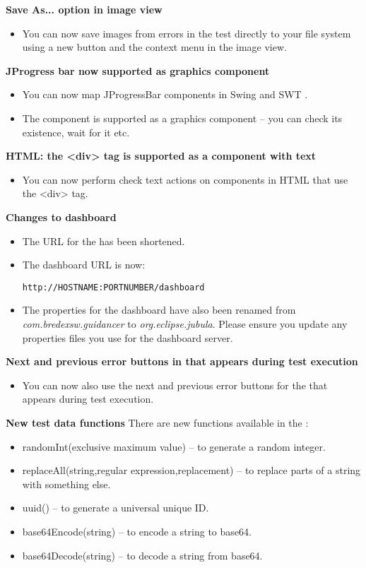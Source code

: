 \textbf{Save As... option in image view}
\begin{itemize}
\item You can now save images from errors in the test directly to your file system  using a new button and the context menu in the image view.
\end{itemize}

\textbf{JProgress bar now supported as graphics component}
\begin{itemize}
\item You can now map JProgressBar components in Swing and SWT \gdauts{}.
\item The component is supported as a graphics component -- you can check its existence, wait for it etc.
\end{itemize}

\textbf{HTML: the <div> tag is supported as a component with text}
\begin{itemize}
\item You can now perform check text actions on components in HTML \gdauts{} that use the <div> tag.
\end{itemize}

\textbf{Changes to dashboard}
\begin{itemize}
\item The URL for the \dash{} has been shortened. 
\item The dashboard URL is now:
\begin{verbatim}
http://HOSTNAME:PORTNUMBER/dashboard
\end{verbatim}
\item The properties for the dashboard have also been renamed from \textit{com.bredexsw.guidancer} to \textit{org.eclipse.jubula}. Please ensure you update any properties files you use for the dashboard server.
\end{itemize}

\textbf{Next and previous error buttons in \gdtestresultview{} that appears during test execution}
\begin{itemize}
\item You can now also use the next and previous error buttons for the \gdtestresultview{} that appears during test execution.
\end{itemize}

\textbf{New test data functions}
There are new functions available in the \ite{}:
\begin{itemize}
\item randomInt(exclusive maximum value) -- to generate a random integer.
\item replaceAll(string,regular expression,replacement) -- to replace parts of a string with something else.
\item uuid() -- to generate a universal unique ID.
\item base64Encode(string) -- to encode a string to base64.
\item base64Decode(string) -- to decode a string from base64.
\end{itemize}

